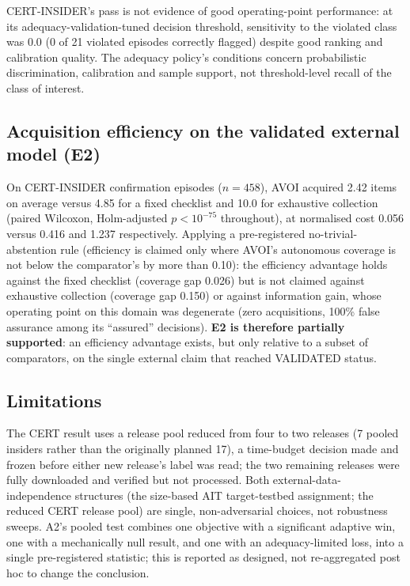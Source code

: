 CERT-INSIDER's pass is not evidence of good operating-point performance: at its adequacy-validation-tuned decision
threshold, sensitivity to the violated class was 0.0 (0 of 21 violated episodes correctly flagged) despite good ranking
and calibration quality. The adequacy policy's conditions concern probabilistic discrimination, calibration and sample
support, not threshold-level recall of the class of interest.

\subsection{Acquisition efficiency on the validated external model (E2)}
On CERT-INSIDER confirmation episodes ($n=458$), AVOI acquired 2.42 items on average versus 4.85 for a fixed checklist
and 10.0 for exhaustive collection (paired Wilcoxon, Holm-adjusted $p<10^{-75}$ throughout), at normalised cost 0.056
versus 0.416 and 1.237 respectively. Applying a pre-registered no-trivial-abstention rule (efficiency is claimed only
where AVOI's autonomous coverage is not below the comparator's by more than 0.10): the efficiency advantage holds
against the fixed checklist (coverage gap 0.026) but is not claimed against exhaustive collection (coverage gap 0.150)
or against information gain, whose operating point on this domain was degenerate (zero acquisitions, 100\% false
assurance among its ``assured'' decisions). \textbf{E2 is therefore partially supported}: an efficiency advantage
exists, but only relative to a subset of comparators, on the single external claim that reached VALIDATED status.

\subsection{Limitations}
The CERT result uses a release pool reduced from four to two releases (7 pooled insiders rather than the originally
planned 17), a time-budget decision made and frozen before either new release's label was read; the two remaining
releases were fully downloaded and verified but not processed. Both external-data-independence structures (the
size-based AIT target-testbed assignment; the reduced CERT release pool) are single, non-adversarial choices, not
robustness sweeps. A2's pooled test combines one objective with a significant adaptive win, one with a mechanically
null result, and one with an adequacy-limited loss, into a single pre-registered statistic; this is reported as
designed, not re-aggregated post hoc to change the conclusion.
